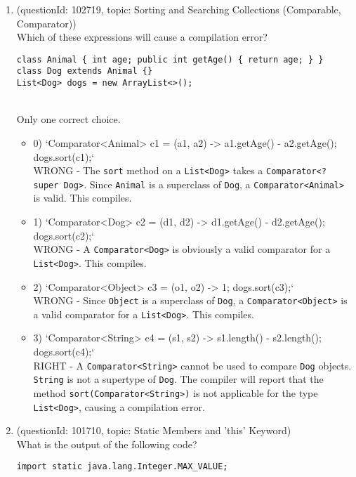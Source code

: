 \documentclass[12pt]{article}
\begin{document}
\begin{enumerate}[label=(\arabic*)]
\begin{itemize}
\end{itemize}
\item (questionId: 102719, topic: Sorting and Searching Collections (Comparable, Comparator)) \\ 
Which of these expressions will cause a compilation error?
\begin{verbatim}
class Animal { int age; public int getAge() { return age; } }
class Dog extends Animal {}
List<Dog> dogs = new ArrayList<>();
\end{verbatim}
\\ \noindent Only one correct choice. 
\begin{itemize}
\item 0) `Comparator<Animal> c1 = (a1, a2) -> a1.getAge() - a2.getAge(); dogs.sort(c1);`
 \\ 
WRONG - The \verb|sort| method on a \verb|List<Dog>| takes a \verb|Comparator<? super Dog>|. Since \verb|Animal| is a superclass of \verb|Dog|, a \verb|Comparator<Animal>| is valid. This compiles.

\item 1) `Comparator<Dog> c2 = (d1, d2) -> d1.getAge() - d2.getAge(); dogs.sort(c2);`
 \\ 
WRONG - A \verb|Comparator<Dog>| is obviously a valid comparator for a \verb|List<Dog>|. This compiles.

\item 2) `Comparator<Object> c3 = (o1, o2) -> 1; dogs.sort(c3);`
 \\ 
WRONG - Since \verb|Object| is a superclass of \verb|Dog|, a \verb|Comparator<Object>| is a valid comparator for a \verb|List<Dog>|. This compiles.

\item 3) `Comparator<String> c4 = (s1, s2) -> s1.length() - s2.length(); dogs.sort(c4);`
 \\ 
RIGHT - A \verb|Comparator<String>| cannot be used to compare \verb|Dog| objects. \verb|String| is not a supertype of \verb|Dog|. The compiler will report that the method \verb|sort(Comparator<String>)| is not applicable for the type \verb|List<Dog>|, causing a compilation error.

\end{itemize}
\item (questionId: 101710, topic: Static Members and 'this' Keyword) \\ 
What is the output of the following code?\n\begin{verbatim}
import static java.lang.Integer.MAX_VALUE;


\end{verbatim}
\end{enumerate}
\end{document}
